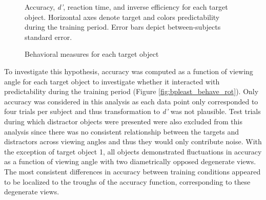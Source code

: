 \documentclass[dwyatte_dissertation.tex]{subfiles}
\begin{document}
\begin{figure}[h!]
\begin{center}
\begin{tabular}{ll}
\end{tabular}
\end{center}
\caption{Behavioral measures for each target object}{Accuracy, \textit{d'}, reaction time, and inverse efficiency for each target object. Horizontal axes denote target and colors predictability during the training period. Error bars depict between-subjects standard error.}
\label{fig:bpleast_behave_obj}
\end{figure}

To investigate this hypothesis, accuracy was computed as a function of viewing angle for each target object to investigate whether it interacted with predictability during the training period (Figure \ref{fig:bpleast_behave_rot}). Only accuracy was considered in this analysis as each data point only corresponded to four trials per subject and thus transformation to \textit{d'} was not plausible. Test trials during which distractor objects were presented were also excluded from this analysis since there was no consistent relationship between the targets and distractors across viewing angles and thus they would only contribute noise. With the exception of target object 1, all objects demonstrated fluctuations in accuracy as a function of viewing angle with two diametrically opposed degenerate views. The most consistent differences in accuracy between training conditions appeared to be localized to the troughs of the accuracy function, corresponding to these degenerate views.
\end{document}
